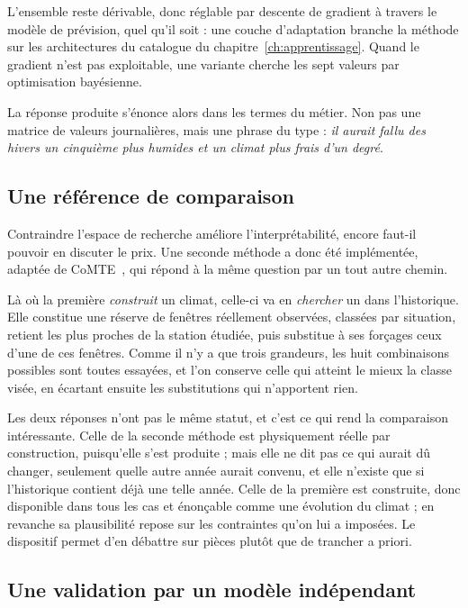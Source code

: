 L'ensemble reste dérivable, donc réglable par descente de gradient à travers le modèle de
prévision, quel qu'il soit : une couche d'adaptation branche la méthode sur les architectures du
catalogue du chapitre~\ref{ch:apprentissage}. Quand le gradient n'est pas exploitable, une
variante cherche les sept valeurs par optimisation bayésienne.

La réponse produite s'énonce alors dans les termes du métier. Non pas une matrice de valeurs
journalières, mais une phrase du type : \emph{il aurait fallu des hivers un cinquième plus
humides et un climat plus frais d'un degré}.

\subsection{Une référence de comparaison}

Contraindre l'espace de recherche améliore l'interprétabilité, encore faut-il pouvoir en
discuter le prix. Une seconde méthode a donc été implémentée, adaptée de CoMTE~\cite{ates2021comte}, qui répond à la même question par un tout autre
chemin.

Là où la première \emph{construit} un climat, celle-ci va en \emph{chercher} un dans
l'historique. Elle constitue une réserve de fenêtres réellement observées, classées par
situation, retient les plus proches de la station étudiée, puis substitue à ses forçages ceux
d'une de ces fenêtres. Comme il n'y a que trois grandeurs, les huit combinaisons possibles sont
toutes essayées, et l'on conserve celle qui atteint le mieux la classe visée, en écartant
ensuite les substitutions qui n'apportent rien.

Les deux réponses n'ont pas le même statut, et c'est ce qui rend la comparaison intéressante.
Celle de la seconde méthode est physiquement réelle par construction, puisqu'elle s'est
produite ; mais elle ne dit pas ce qui aurait dû changer, seulement quelle autre année aurait
convenu, et elle n'existe que si l'historique contient déjà une telle année. Celle de la
première est construite, donc disponible dans tous les cas et énonçable comme une évolution du
climat ; en revanche sa plausibilité repose sur les contraintes qu'on lui a imposées. Le
dispositif permet d'en débattre sur pièces plutôt que de trancher a priori.

\subsection{Une validation par un modèle indépendant}

